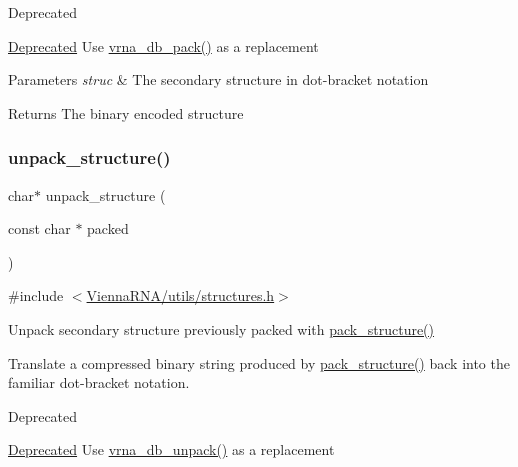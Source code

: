 \begin{DoxyRefDesc}{Deprecated}
\item[\mbox{\hyperlink{deprecated__deprecated000198}{Deprecated}}]Use \mbox{\hyperlink{group__struct__utils__dot__bracket_ga55c4783060a1464f862f858d5599c9e1}{vrna\+\_\+db\+\_\+pack()}} as a replacement\end{DoxyRefDesc}

\begin{DoxyParams}{Parameters}
{\em struc} & The secondary structure in dot-\/bracket notation \\
\hline
\end{DoxyParams}
\begin{DoxyReturn}{Returns}
The binary encoded structure 
\end{DoxyReturn}
\mbox{\label{group__struct__utils__deprecated_ga071c6921efe1eb974f115ee6fefa3c39}} 
\subsubsection{\texorpdfstring{unpack\_structure()}{unpack\_structure()}}
{\footnotesize\ttfamily char$\ast$ unpack\+\_\+structure (\begin{DoxyParamCaption}\item[{const char $\ast$}]{packed }\end{DoxyParamCaption})}



{\ttfamily \#include $<$\mbox{\hyperlink{utils_2structures_8h}{Vienna\+R\+N\+A/utils/structures.\+h}}$>$}



Unpack secondary structure previously packed with \mbox{\hyperlink{group__struct__utils__deprecated_gac6dfa5e22928c087c6e09ff0054a7ced}{pack\+\_\+structure()}} 

Translate a compressed binary string produced by \mbox{\hyperlink{group__struct__utils__deprecated_gac6dfa5e22928c087c6e09ff0054a7ced}{pack\+\_\+structure()}} back into the familiar dot-\/bracket notation.

\begin{DoxyRefDesc}{Deprecated}
\item[\mbox{\hyperlink{deprecated__deprecated000199}{Deprecated}}]Use \mbox{\hyperlink{group__struct__utils__dot__bracket_ga6490adff857d84ce06e6f379ae3a4512}{vrna\+\_\+db\+\_\+unpack()}} as a replacement\end{DoxyRefDesc}


